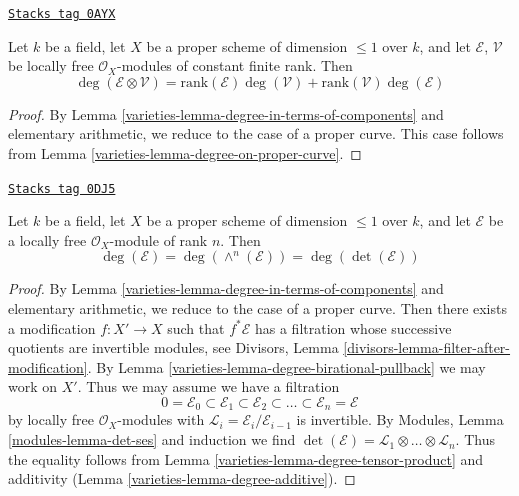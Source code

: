 \begin{lemma}
\label{varieties-lemma-degree-tensor-product}
\href{https://stacks.math.columbia.edu/tag/0AYX}{\texttt{Stacks tag 0AYX}}

Let $k$ be a field, let $X$ be a proper scheme of dimension $\leq 1$
over $k$, and let $\mathcal{E}$, $\mathcal{V}$ be locally free
$\mathcal{O}_X$-modules of constant finite rank. Then
$$
\deg(\mathcal{E} \otimes \mathcal{V}) =
\text{rank}(\mathcal{E}) \deg(\mathcal{V}) +
\text{rank}(\mathcal{V}) \deg(\mathcal{E})
$$
\end{lemma}

\begin{proof}

By Lemma \ref{varieties-lemma-degree-in-terms-of-components} and elementary
arithmetic, we reduce to the case of a proper curve.
This case follows from Lemma \ref{varieties-lemma-degree-on-proper-curve}.
\end{proof}

\begin{lemma}
\label{varieties-lemma-degree-and-det}
\href{https://stacks.math.columbia.edu/tag/0DJ5}{\texttt{Stacks tag 0DJ5}}

Let $k$ be a field, let $X$ be a proper scheme of dimension $\leq 1$
over $k$, and let $\mathcal{E}$ be a locally free
$\mathcal{O}_X$-module of rank $n$. Then
$$
\deg(\mathcal{E}) = \deg(\wedge^n(\mathcal{E})) = \deg(\det(\mathcal{E}))
$$
\end{lemma}

\begin{proof}

By Lemma \ref{varieties-lemma-degree-in-terms-of-components} and elementary
arithmetic, we reduce to the case of a proper curve.
Then there exists a modification $f : X' \to X$ such that
$f^*\mathcal{E}$ has a filtration whose successive
quotients are invertible modules, see
Divisors, Lemma \ref{divisors-lemma-filter-after-modification}.
By Lemma \ref{varieties-lemma-degree-birational-pullback} we may work on $X'$.
Thus we may assume we have a filtration
$$
0 = \mathcal{E}_0 \subset \mathcal{E}_1 \subset \mathcal{E}_2 \subset
\ldots \subset \mathcal{E}_n = \mathcal{E}
$$
by locally free $\mathcal{O}_X$-modules
with $\mathcal{L}_i = \mathcal{E}_i/\mathcal{E}_{i - 1}$ is invertible.
By Modules, Lemma \ref{modules-lemma-det-ses} and induction we find
$\det(\mathcal{E}) = \mathcal{L}_1 \otimes \ldots \otimes \mathcal{L}_n$.
Thus the equality follows from Lemma \ref{varieties-lemma-degree-tensor-product}
and additivity (Lemma \ref{varieties-lemma-degree-additive}).
\end{proof}

